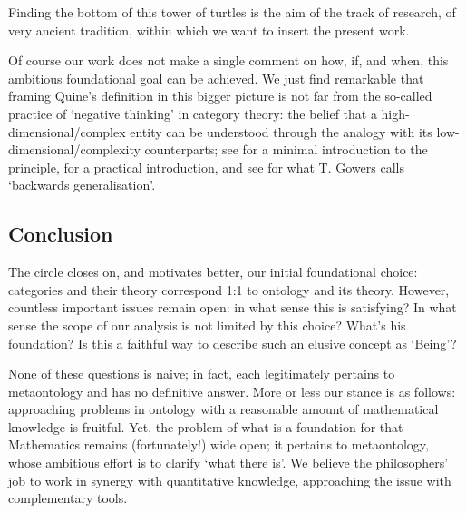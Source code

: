 Finding the bottom of this tower of turtles is the aim of the track of research, of very ancient tradition, within which we want to insert the present work.

Of course our work does not make a single comment on how, if, and when, this ambitious foundational goal can be achieved. We just find remarkable that framing Quine's definition in this bigger picture is not far from the so-called practice of `negative thinking' in category theory: the belief that a high-dimensional/complex entity can be understood through the analogy with its low-dimensional/complexity counterparts; see \cite{nlab:category-order,nlab:neg-think} for a minimal introduction to the principle, \cite{baez2010lectures} for a practical introduction, and see \cite{gowers2007} for what T. Gowers calls `backwards generalisation'.
\subsection{Conclusion}
The circle closes on, and motivates better, our initial foundational choice: categories and their theory correspond 1:1 to ontology and its theory. However, countless important issues remain open: in what sense this is satisfying? In what sense the scope of our analysis is not limited by this choice? What's his foundation? Is this a faithful way to describe such an elusive concept as `Being'?

None of these questions is naive; in fact, each legitimately pertains to metaontology and has no definitive answer. More or less our stance is as follows: approaching problems in ontology with a reasonable amount of mathematical knowledge is fruitful. Yet, the problem of what is a foundation for that Mathematics remains (fortunately!) wide open; it pertains to metaontology, whose ambitious effort is to clarify `what there is'. We believe the philosophers' job to work in synergy with quantitative knowledge, approaching the issue with complementary tools.